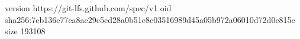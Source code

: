 version https://git-lfs.github.com/spec/v1
oid sha256:7cb136e77ea8ae29c5cd28a0b51e8e03516989d45a05b972a06010d72d0c815e
size 193108
